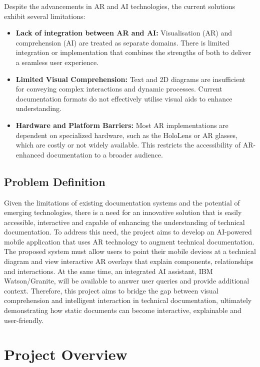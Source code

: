 \documentclass[10pt]{article}
\begin{document}
        Despite the advancements in AR and AI technologies, the current solutions exhibit several limitations:
        \begin{itemize}
            \item \textbf{Lack of integration between AR and AI:}
                Visualisation (AR) and comprehension (AI) are treated as separate domains. There is limited integration or implementation that combines the strengths of both to deliver a seamless user experience.
            \item \textbf{Limited Visual Comprehension:}
                Text and 2D diagrams are insufficient for conveying complex interactions and dynamic processes. Current documentation formats do not effectively utilise visual aids to enhance understanding.
            \item \textbf{Hardware and Platform Barriers:}
                Most AR implementations are dependent on specialized hardware, such as the HoloLens or AR glasses, which are costly or not widely available. This restricts the accessibility of AR-enhanced documentation to a broader audience.
        \end{itemize}

    \subsection{Problem Definition}

    Given the limitations of existing documentation systems and the potential of emerging technologies, there is a need for an innovative solution that is easily accessible, interactive and capable of enhancing
    the understanding of technical documentation. To address this need, the project aims to develop an AI-powered mobile application that uses AR technology to augment technical documentation. The proposed system must 
    allow users to point their mobile devices at a technical diagram and view interactive AR overlays that explain components, relationships and interactions. At the same time, an integrated AI assistant, IBM Watson/Granite,
    will be available to answer user queries and provide additional context. Therefore, this project aims to bridge the gap between visual comprehension and intelligent interaction in technical documentation, ultimately demonstrating how static documents can become interactive, explainable and user-friendly.


\section{Project Overview}
\end{document}
